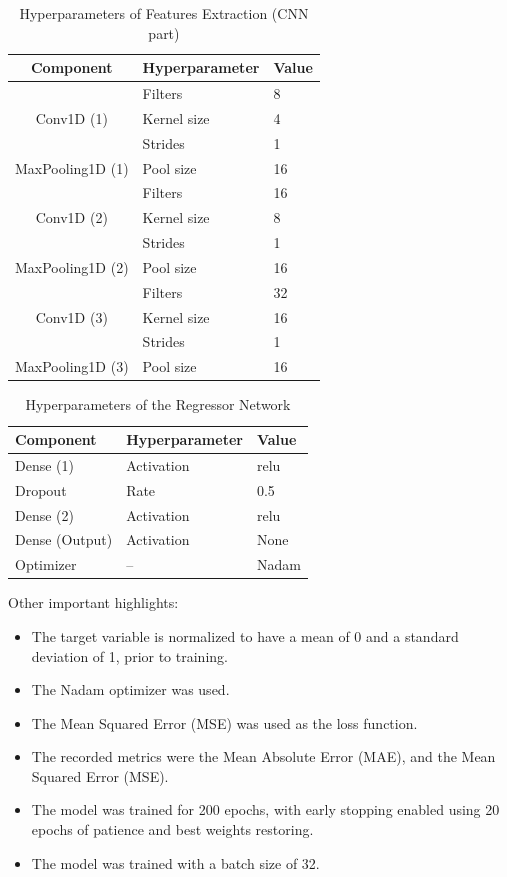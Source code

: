 \documentclass[10pt,conference]{IEEEtran}
\begin{document}
\begin{table} \small \centering
  \caption{Hyperparameters of Features Extraction (CNN part)}
  \label{tab:hyperparams_cnn}
  \begin{tabular}{cll}
    \toprule
    Component & Hyperparameter & Value \\
    \midrule
    \multirow{3}{*}{Conv1D (1)} 
        & Filters & 8 \\
        & Kernel size & 4 \\
        & Strides & 1 \\
    MaxPooling1D (1) & Pool size & 16 \\
    \multirow{3}{*}{Conv1D (2)} 
        & Filters & 16 \\
        & Kernel size & 8 \\
        & Strides & 1 \\
    MaxPooling1D (2) & Pool size & 16 \\
    \multirow{3}{*}{Conv1D (3)} 
        & Filters & 32 \\
        & Kernel size & 16 \\
        & Strides & 1 \\
    MaxPooling1D (3) & Pool size & 16 \\
    \bottomrule
  \end{tabular}
\end{table}


\begin{table} \small \centering
  \caption{Hyperparameters of the Regressor Network}
  \label{tab:hyperparams_regressor}
  \begin{tabular}{lll}
    \toprule
    Component & Hyperparameter & Value \\
    \midrule
    \multirow{1}{*}{Dense (1)} 
        & Activation & relu \\
    Dropout & Rate & 0.5 \\
    \multirow{1}{*}{Dense (2)} 
        & Activation & relu \\
    \multirow{1}{*}{Dense (Output)} 
        & Activation & None \\
    Optimizer & -- & Nadam \\
    \bottomrule
  \end{tabular}
\end{table}

Other important highlights:

\begin{itemize}
    \item The target variable is normalized to have a mean of 0 and a standard deviation of 1, prior to training.
    \item The Nadam optimizer was used.
    \item The Mean Squared Error (MSE) was used as the loss function.
    \item The recorded metrics were the Mean Absolute Error (MAE), and the Mean Squared Error (MSE).
    \item The model was trained for 200 epochs, with early stopping enabled using 20 epochs of patience and best weights restoring.
    \item The model was trained with a batch size of 32.
\end{itemize}
\end{document}
